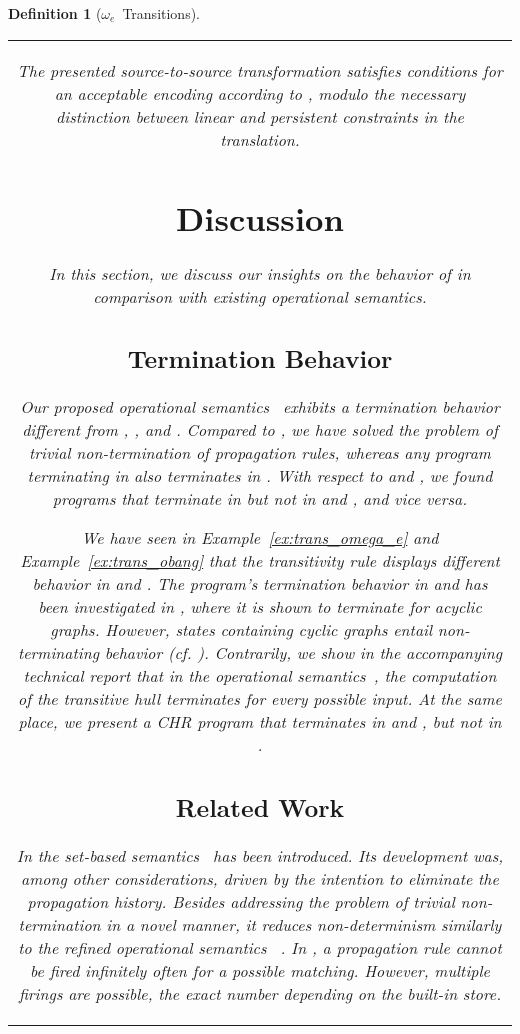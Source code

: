 \documentclass{tlp}
\newtheorem{definition}{Definition}[section]
\newcommand{\oesq}{\ensuremath{{\omega_e}}}
\begin{document}
\begin{definition}[\oesq~Transitions]
\begin{center}
\begin{tabular*}{8.25cm}{c}
The presented source-to-source transformation satisfies conditions for an
\emph{acceptable encoding} according to \cite{Gabbrielli2009}, modulo the
necessary distinction between linear and persistent constraints in the
translation.

\section{Discussion}
\label{sec:discussion}

In this section, we discuss our insights on the behavior of  in
comparison with existing operational semantics.

\subsection{Termination Behavior}\label{sec:termination}

Our proposed operational
semantics~ exhibits a termination behavior different from ,
, and . Compared to , we have solved the problem of
trivial non-termination of propagation rules, whereas any program terminating in
 also terminates in . With respect to  and ,
we found programs that terminate in  but not in  and
, and vice versa.

We have seen in Example~\ref{ex:trans_omega_e} and Example~\ref{ex:trans_obang}
that the transitivity rule displays different behavior in  and .
The program's termination behavior in  and  has been
investigated in \cite{Pilozzi2009}, where it is shown to terminate for acyclic
graphs. However, states containing cyclic graphs entail non-terminating behavior
(cf. \cite{Betz2010}). Contrarily, we show in the accompanying
technical report \cite{Betz2010} that in the operational semantics~, 
the computation of the transitive hull terminates for every possible input.
At the same place, we present a CHR program that terminates in  and
, but not in .

\subsection{Related Work}
\label{sec:related_work}

In \cite{Sarna-Starosta2007} the set-based semantics~ has been
introduced. Its development was, among other considerations, driven by the
intention to eliminate the propagation history. Besides addressing the problem of
trivial non-termination in a novel manner, it reduces non-determinism similarly
to the refined operational semantics~ \cite{Duck2004}. In
, a propagation rule cannot be fired infinitely often for a
possible matching. However, multiple firings are possible, the exact number
depending on the built-in store. 


\end{tabular*}
\end{center}
\end{definition}
\end{document}
